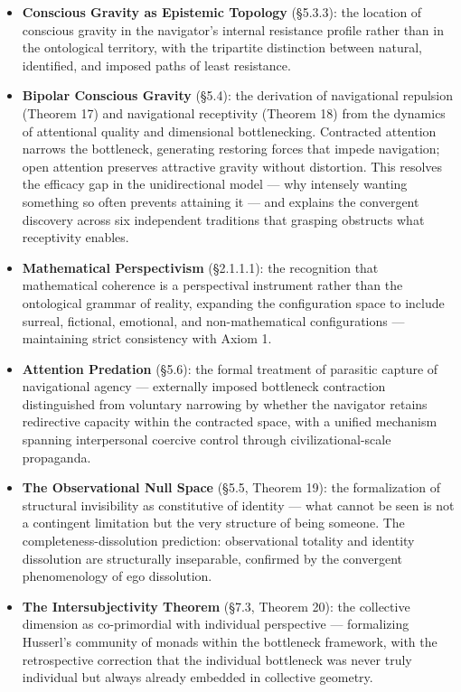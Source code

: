 \begin{itemize}[nosep,leftmargin=*]
  \item \textbf{Conscious Gravity as Epistemic Topology} (§5.3.3): the location of conscious gravity in the navigator's internal resistance profile rather than in the ontological territory, with the tripartite distinction between natural, identified, and imposed paths of least resistance.
  \item \textbf{Bipolar Conscious Gravity} (§5.4): the derivation of navigational repulsion (Theorem 17) and navigational receptivity (Theorem 18) from the dynamics of attentional quality and dimensional bottlenecking. Contracted attention narrows the bottleneck, generating restoring forces that impede navigation; open attention preserves attractive gravity without distortion. This resolves the efficacy gap in the unidirectional model — why intensely wanting something so often prevents attaining it — and explains the convergent discovery across six independent traditions that grasping obstructs what receptivity enables.
  \item \textbf{Mathematical Perspectivism} (§2.1.1.1): the recognition that mathematical coherence is a perspectival instrument rather than the ontological grammar of reality, expanding the configuration space to include surreal, fictional, emotional, and non-mathematical configurations — maintaining strict consistency with Axiom 1.
  \item \textbf{Attention Predation} (§5.6): the formal treatment of parasitic capture of navigational agency — externally imposed bottleneck contraction distinguished from voluntary narrowing by whether the navigator retains redirective capacity within the contracted space, with a unified mechanism spanning interpersonal coercive control through civilizational-scale propaganda.
  \item \textbf{The Observational Null Space} (§5.5, Theorem 19): the formalization of structural invisibility as constitutive of identity — what cannot be seen is not a contingent limitation but the very structure of being someone. The completeness-dissolution prediction: observational totality and identity dissolution are structurally inseparable, confirmed by the convergent phenomenology of ego dissolution.
  \item \textbf{The Intersubjectivity Theorem} (§7.3, Theorem 20): the collective dimension as co-primordial with individual perspective — formalizing Husserl's community of monads within the bottleneck framework, with the retrospective correction that the individual bottleneck was never truly individual but always already embedded in collective geometry.

\end{itemize}
